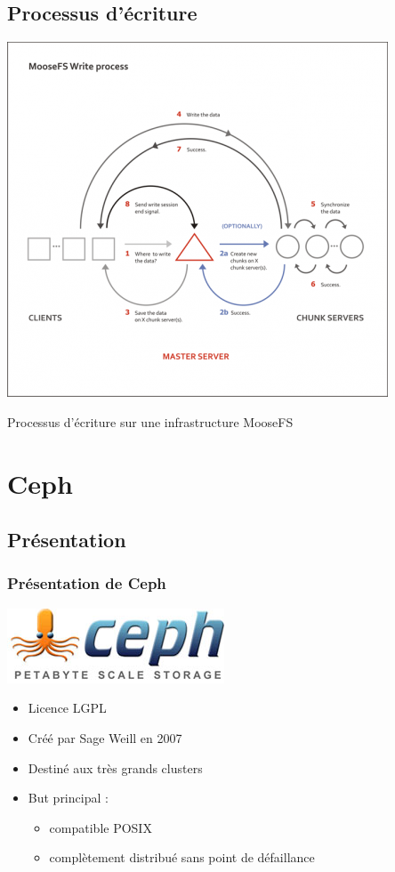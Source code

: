 \documentclass[blue]{beamer}
\begin{document}
\subsection{Processus d'écriture}
\begin{frame}
\begin{center}
\includegraphics[width=0.7\linewidth]{../images/mastersrvwrite.png}
\end{center}
Processus d'écriture sur une infrastructure MooseFS
\end{frame}

\section{Ceph}
        \subsection{Présentation}
        \begin{frame}
                \frametitle{Présentation de Ceph}
                \begin{center}
		       \includegraphics[width=0.30\linewidth]{../images/cephfs.jpg}
		\end{center}
		\begin{itemize}
			\item Licence LGPL
			\item Créé par Sage Weill en 2007
			\item Destiné aux très grands clusters
			\item But principal : 
                              \begin{itemize}
                                      \item compatible POSIX
                                      \item complètement distribué sans point de défaillance
                              \end{itemize}
		\end{itemize}
        \end{frame}
\end{document}
